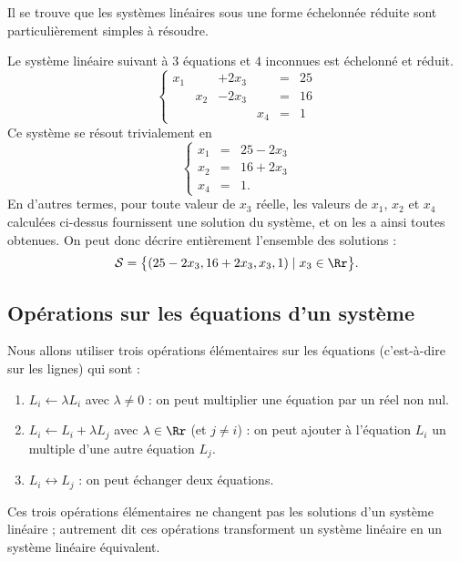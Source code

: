 \documentclass[class=report,crop=false]{standalone}
\begin{document}
Il se trouve que les systèmes linéaires sous une forme échelonnée réduite
sont particulièrement simples à résoudre.

\begin{exemple}
\label{syslin:exsysechel}
Le système linéaire suivant à $3$ équations et $4$ inconnues est échelonné et réduit.
$$\left\{\begin{array}{cccccc}
x_1&&+2x_3&&=&25\\
&x_2&-2x_3&&=&16\\
&&&x_4&=&1
\end{array}\right.
$$
Ce système se résout trivialement en
$$\left\{\begin{array}{ccc}
x_1&=&25-2x_3\\
x_2&=&16+2x_3\\
x_4&=&1.
\end{array}\right.
$$
En d'autres termes, pour toute valeur de $x_3$ réelle,
les valeurs de $x_1$, $x_2$ et $x_4$ calculées ci-dessus fournissent
une solution du système, et on les a ainsi toutes obtenues.
On peut donc décrire entièrement l'ensemble des solutions :
$$\mathcal{S}=\big\{(25-2x_3,16+2x_3,x_3,1) \mid x_3\in \Rr \big\}.$$
\end{exemple}


\subsection{Opérations sur les équations d'un système}

Nous allons utiliser trois opérations
élémentaires sur les équations (c'est-à-dire sur les lignes) qui sont :
\begin{enumerate}
  \item $L_i \leftarrow \lambda L_i$ avec $\lambda \neq 0$ :
  on peut multiplier une équation par un réel non nul.

  \item $L_i \leftarrow L_i+\lambda L_j$ avec $\lambda \in \Rr$ (et $j\neq i$) :
  on peut ajouter à l'équation $L_i$ un multiple d'une autre équation $L_j$.

  \item $L_i \leftrightarrow L_j$ : on peut échanger deux équations.
\end{enumerate}

Ces trois opérations élémentaires ne changent pas les solutions d'un système linéaire ;
autrement dit ces opérations transforment un système linéaire en un système linéaire équivalent.
\end{document}
